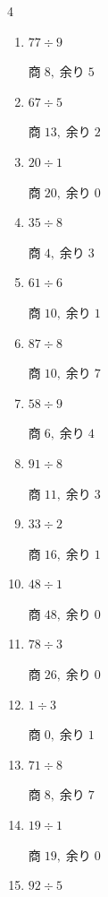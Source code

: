 \begin{multicols}{4}
\begin{enumerate}
        $商\; 4,\; 余り\; 1$

  \item $77 \div 9$

        $商\; 8,\; 余り\; 5$

  \item $67 \div 5$

        $商\; 13,\; 余り\; 2$

  \item $20 \div 1$

        $商\; 20,\; 余り\; 0$

  \item $35 \div 8$

        $商\; 4,\; 余り\; 3$

  \item $61 \div 6$

        $商\; 10,\; 余り\; 1$

  \item $87 \div 8$

        $商\; 10,\; 余り\; 7$

  \item $58 \div 9$

        $商\; 6,\; 余り\; 4$

  \item $91 \div 8$

        $商\; 11,\; 余り\; 3$

  \item $33 \div 2$

        $商\; 16,\; 余り\; 1$

\columnbreak %

  \item $48 \div 1$

        $商\; 48,\; 余り\; 0$

  \item $78 \div 3$

        $商\; 26,\; 余り\; 0$

  \item $1 \div 3$

        $商\; 0,\; 余り\; 1$

  \item $71 \div 8$

        $商\; 8,\; 余り\; 7$

  \item $19 \div 1$

        $商\; 19,\; 余り\; 0$

  \item $92 \div 5$


\end{enumerate}
\end{multicols}
